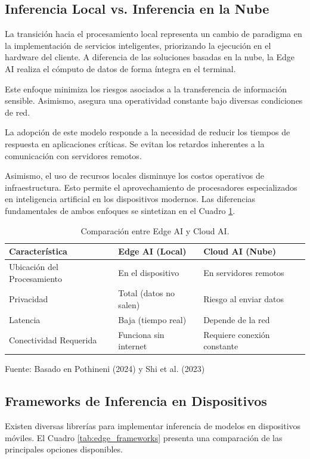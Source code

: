 \subsection{Inferencia Local vs. Inferencia en la Nube}
La transición hacia el procesamiento local representa un cambio de paradigma en la implementación de servicios inteligentes, priorizando la ejecución en el hardware del cliente. A diferencia de las soluciones basadas en la nube, la Edge AI realiza el cómputo de datos de forma íntegra en el terminal.

Este enfoque minimiza los riesgos asociados a la transferencia de información sensible. Asimismo, asegura una operatividad constante bajo diversas condiciones de red.

La adopción de este modelo responde a la necesidad de reducir los tiempos de respuesta en aplicaciones críticas. Se evitan los retardos inherentes a la comunicación con servidores remotos.

Asimismo, el uso de recursos locales disminuye los costos operativos de infraestructura. Esto permite el aprovechamiento de procesadores especializados en inteligencia artificial en los dispositivos modernos. Las diferencias fundamentales de ambos enfoques se sintetizan en el Cuadro \ref{tab:edge_vs_cloud}.

\begin{table}[H]
\centering
\begin{tabularx}{\linewidth}{p{3.5cm} p{4.5cm} p{4.5cm}}
\toprule
Característica & Edge AI (Local) & Cloud AI (Nube) \\
\midrule
Ubicación del Procesamiento & En el dispositivo & En servidores remotos \\
Privacidad & Total (datos no salen) & Riesgo al enviar datos \\
Latencia & Baja (tiempo real) & Depende de la red \\
Conectividad Requerida & Funciona sin internet & Requiere conexión constante \\
\bottomrule
\end{tabularx}
\caption{Comparación entre Edge AI y Cloud AI.}\label{tab:edge_vs_cloud}
Fuente: Basado en Pothineni (2024) \cite{pothineni2024offline} y Shi et al. (2023) \cite{edge_ai_arxiv}
\end{table}

\subsection{Frameworks de Inferencia en Dispositivos}
Existen diversas librerías para implementar inferencia de modelos en dispositivos móviles. El Cuadro \ref{tab:edge_frameworks} presenta una comparación de las principales opciones disponibles.


